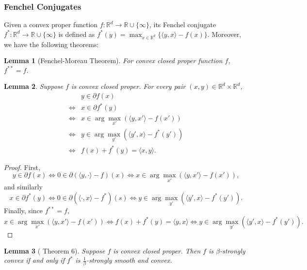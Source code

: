 \documentclass{article}
\newtheorem{lemma}{Lemma}
\begin{document}
\subsubsection{Fenchel Conjugates}
Given a convex proper function $f:\mathbb{R}^d\to \mathbb{R}\cup\{\infty\}$, its Fenchel conjugate $f^*:\mathbb{R}^d\to \mathbb{R}\cup\{\infty\}$ is defined as $f^*(y)=\max_{x\in \mathbb{R}^d}\{\langle y,x\rangle-f(x)\}$. Moreover, we have the following theorems:
\begin{lemma}[Fenchel-Moreau Theorem]
    For convex closed proper function $f$, $f^{**}=f$.
\end{lemma}
\begin{lemma}\label{primalDualVar}
    Suppose $f$ is convex closed proper. For every pair $(x,y) \in \mathbb{R}^d\times \mathbb{R}^d$,
    \begin{equation}
        \begin{array}{cl}
             & y \in \partial f(x) \\
            \iff & x \in \partial f^*(y) \\
            \iff & x \in \arg\max_{x'} ( \langle y,x'\rangle - f(x') ) \\
            \iff & y \in \arg\max_{y'} ( \langle y',x\rangle - f^*(y') ) \\
            \iff & f(x)+f^*(y)=\langle x,y\rangle.
        \end{array}
    \end{equation}
\end{lemma}
\begin{proof}
    First,
    \begin{equation}
        y\in\partial f(x)\iff0\in\partial(\langle y,\cdot\rangle-f)(x)\iff x\in\arg\max_{x'}(\langle y,x'\rangle-f(x')),
    \end{equation}
    and similarly
    \begin{equation}
        x\in\partial f^*(y)\iff0\in\partial(\langle\cdot,x\rangle-f^*)(s)\iff y\in\arg\max_{y'}(\langle y',x\rangle-f^*(y')).
    \end{equation}
    Finally, since $f^{**}=f$,
    \begin{equation}
        x\in\arg\max_{x'}(\langle y,x'\rangle-f(x'))\iff f(x)+f^*(y)=\langle y,x\rangle\iff y\in\arg\max_{y'}(\langle y',x\rangle-f^*(y')).
    \end{equation}
\end{proof}
\begin{lemma}[\cite{KST09} Theorem 6]\label{strConvSmoothDual}
    Suppose $f$ is convex closed proper. Then $f$ is $\beta$-strongly convex if and only if $f^*$ is $\frac{1}{\beta}$-strongly smooth and convex.
\end{lemma}
\end{document}
